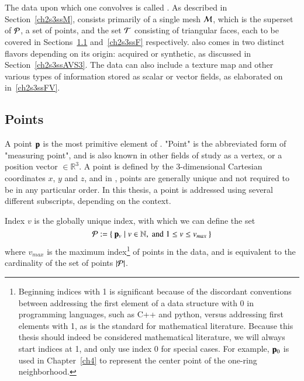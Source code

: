 %
%
%
%
\section{\tdd}
\label{ch2s3}
The data upon which one convolves  is called \tdd{}. As described in Section~\ref{ch2s3ssM}, \tdd{} consists primarily of a single mesh $\mathcal{M}$, which is the superset of $\mathcal{P}$, a set of points, and the set $\mathcal{T}$ consisting of triangular faces, each to be covered in Sections~\ref{ch2s3ssP} and~\ref{ch2s3ssF} respectively. \tdd{} also comes in two distinct flavors depending on its origin: acquired or synthetic, as discussed in Section~\ref{ch2s3ssAVS3}. The data can also include a texture map and other various types of information stored as scalar or vector fields, as elaborated on in~\ref{ch2s3ssFV}.

%
%
%
\subsection{Points}
\label{ch2s3ssP}
A point $\mathbf{p}$ is the most primitive element of \tdd{}. "Point" is the abbreviated form of "measuring point", and is also known in other fields of study as a vertex, or a position vector $\in \mathbb{R}^3$. A point is defined by the 3-dimensional Cartesian coordinates $x$, $y$ and $z$, and in \tdd{}, points are generally unique and not required to be in any particular order. In this thesis, a point is addressed using several different subscripts, depending on the context.

Index $v$ is the globally unique index, with which we can define the set
%
\begin{equation}
	\mathcal{P} := \left \{\:\mathbf{p}_v \mid v \in \mathbb{N}, \;\text{and}\; 1\leq v \leq v_{max}\:\right \}
	\label{eq:defineSetOfPoints}
\end{equation}
%
where $v_{max}$ is the maximum index\footnote{Beginning indices with 1 is significant because of the discordant conventions between addressing the first element of a data structure with 0 in programming languages, such as C++ and python, versus addressing first elements with 1, as is the standard for mathematical literature. Because this thesis should indeed be considered mathematical literature, we will always start indices at 1, and only use index 0 for special cases. For example, $\mathbf{p}_0$ is used in Chapter~\ref{ch4} to represent the center point of the one-ring neighborhood.} of points in the data, and is equivalent to the cardinality of the set of points $|\mathcal{P}|$.%
%
%


